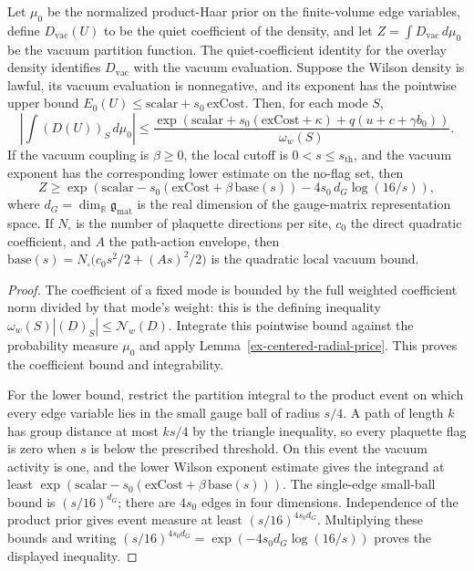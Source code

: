 \begin{lemma}\label{ex-centered-material-total}
Let $\mu_0$ be the normalized product-Haar prior on the finite-volume edge variables, define $D_{\mathrm{vac}}(U)$ to be the quiet coefficient of the density, and let $Z=\int D_{\mathrm{vac}}\,d\mu_0$ be the vacuum partition function. The quiet-coefficient identity for the overlay density identifies $D_{\mathrm{vac}}$ with the vacuum evaluation. Suppose the Wilson density is lawful, its vacuum evaluation is nonnegative, and its exponent has the pointwise upper bound $E_0(U)\leq\mathrm{scalar}+s_0\,\mathrm{exCost}$. Then, for each mode $S$,
\[
 \left|\int (D(U))_S\,d\mu_0\right|
 \leq \frac{\exp(\mathrm{scalar}+s_0(\mathrm{exCost}+\kappa)+q(u+c+\gamma b_0))}
             {\omega_w(S)}.
 \label{ex-centered-coefficient}
\]
If the vacuum coupling is $\beta\geq0$, the local cutoff is $0<s\leq s_{\mathrm{th}}$, and the vacuum exponent has the corresponding lower estimate on the no-flag set, then
\[
 Z\geq\exp\!\left(\mathrm{scalar}-s_0(\mathrm{exCost}+\beta\,\mathrm{base}(s))
                 -4s_0\,d_G\log(16/s)\right),
 \label{ex-centered-vacuum-lower}
\]
where $d_G=\dim_{\mathbb R}\mathfrak g_{\mathrm{mat}}$ is the real dimension of the gauge-matrix representation space. If $N_{\square}$ is the number of plaquette directions per site, $c_0$ the direct quadratic coefficient, and $A$ the path-action envelope, then $\mathrm{base}(s)=N_{\square}\bigl(c_0s^2/2+(As)^2/2\bigr)$ is the quadratic local vacuum bound.
\end{lemma}
\begin{proof}
The coefficient of a fixed mode is bounded by the full weighted coefficient norm divided by that mode's weight: this is the defining inequality $\omega_w(S)|(D)_S|\leq\mathcal N_w(D)$. Integrate this pointwise bound against the probability measure $\mu_0$ and apply Lemma~\ref{ex-centered-radial-price}. This proves the coefficient bound and integrability.

For the lower bound, restrict the partition integral to the product event on which every edge variable lies in the small gauge ball of radius $s/4$. A path of length $k$ has group distance at most $ks/4$ by the triangle inequality, so every plaquette flag is zero when $s$ is below the prescribed threshold. On this event the vacuum activity is one, and the lower Wilson exponent estimate gives the integrand at least $\exp(\mathrm{scalar}-s_0(\mathrm{exCost}+\beta\,\mathrm{base}(s)))$. The single-edge small-ball bound is $(s/16)^{d_G}$; there are $4s_0$ edges in four dimensions. Independence of the product prior gives event measure at least $(s/16)^{4s_0d_G}$. Multiplying these bounds and writing $(s/16)^{4s_0d_G}=\exp(-4s_0d_G\log(16/s))$ proves the displayed inequality.
\end{proof}

